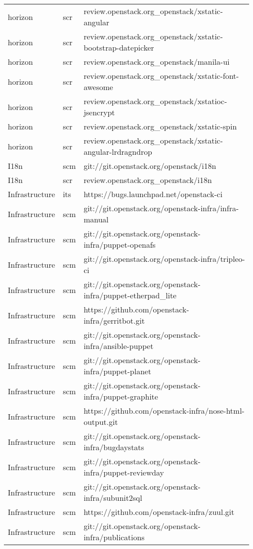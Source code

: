 \begin{center}
\begin{longtable}{|p{4cm}|p{1cm}|p{10cm}|}
horizon&scr&review.openstack.org\_openstack/xstatic-angular\\ 
horizon&scr&review.openstack.org\_openstack/xstatic-bootstrap-datepicker\\ 
horizon&scr&review.openstack.org\_openstack/manila-ui\\ 
horizon&scr&review.openstack.org\_openstack/xstatic-font-awesome\\ 
horizon&scr&review.openstack.org\_openstack/xstatioc-jsencrypt\\ 
horizon&scr&review.openstack.org\_openstack/xstatic-spin\\ 
horizon&scr&review.openstack.org\_openstack/xstatic-angular-lrdragndrop\\ 
I18n&scm&git://git.openstack.org/openstack/i18n\\ 
I18n&scr&review.openstack.org\_openstack/i18n\\ 
Infrastructure&its&https://bugs.launchpad.net/openstack-ci\\ 
Infrastructure&scm&git://git.openstack.org/openstack-infra/infra-manual\\ 
Infrastructure&scm&git://git.openstack.org/openstack-infra/puppet-openafs\\ 
Infrastructure&scm&git://git.openstack.org/openstack-infra/tripleo-ci\\ 
Infrastructure&scm&git://git.openstack.org/openstack-infra/puppet-etherpad\_lite\\ 
Infrastructure&scm&https://github.com/openstack-infra/gerritbot.git\\ 
Infrastructure&scm&git://git.openstack.org/openstack-infra/ansible-puppet\\ 
Infrastructure&scm&git://git.openstack.org/openstack-infra/puppet-planet\\ 
Infrastructure&scm&git://git.openstack.org/openstack-infra/puppet-graphite\\ 
Infrastructure&scm&https://github.com/openstack-infra/nose-html-output.git\\ 
Infrastructure&scm&git://git.openstack.org/openstack-infra/bugdaystats\\ 
Infrastructure&scm&git://git.openstack.org/openstack-infra/puppet-reviewday\\ 
Infrastructure&scm&git://git.openstack.org/openstack-infra/subunit2sql\\ 
Infrastructure&scm&https://github.com/openstack-infra/zuul.git\\ 
Infrastructure&scm&git://git.openstack.org/openstack-infra/publications\\ 

\end{longtable}
\end{center}
